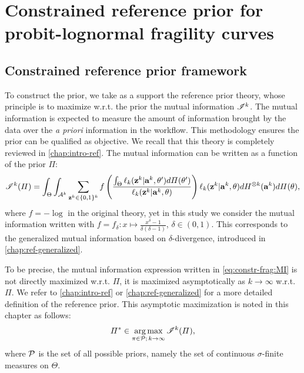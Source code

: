 \section{Constrained reference prior for probit-lognormal fragility curves}\label{sec:constr-frags:constrained}


\subsection{Constrained reference prior framework}\label{sec:constr-frags:subsec-constr-frame}



To construct the prior, we take as a support the reference prior theory, whose principle is to maximize w.r.t. the prior the mutual information $\mathscr{I}^k$. The mutual information is expected to measure the amount of information brought by the data over the \emph{a priori} information in the workflow. This methodology ensures the prior can be qualified as objective. We recall that this theory is completely reviewed in   \cref{chap:intro-ref}.
The mutual information can be written as a function of the prior $\varPi$:
\begin{equation}\label{eq:constr-frag:MI}
    \mathscr{I}^k(\varPi) = \int_{\Theta}\int_{\mathcal{A}^k}\sum_{\mathbf{z}^k\in\{0,1\}^k}f\left(\frac{\int_\Theta\ell_k(\mathbf{z}^k|\mathbf{a}^k,\theta')d\varPi(\theta')  }{\ell_k(\mathbf{z}^k|\mathbf{a}^k,\theta)}\right)\ell_k(\mathbf{z}^k|\mathbf{a}^k,\theta)dH^{\otimes k}(\mathbf{a}^k)d\varPi(\theta)  ,    
\end{equation}
where $f=-\log$ in the original theory, yet in this study we consider the mutual information written with $f=f_\delta:x\mapsto\frac{x^\delta-1}{\delta(\delta-1)}$, $\delta\in(0,1)$.
This corresponds to the generalized mutual information 
based on $\delta$-divergence, introduced in   \cref{chap:ref-generalized}. 

To be precise, the mutual information expression written in \cref{eq:constr-frag:MI} is not directly maximized w.r.t. $\varPi$, it is maximized asymptotically as $k\rightarrow\infty$ w.r.t. $\varPi$. We refer to   \cref{chap:intro-ref} or   \cref{chap:ref-generalized} for a more detailed definition of the reference prior. This asymptotic maximization is noted in this chapter as follows:
\begin{equation}\label{eq:constr-frag:optimnoconstr}
    \varPi^\ast\in\operatorname*{arg\,max}_{\pi\in\mathcal{P};\,k\rightarrow\infty}\mathscr{I}^k(\varPi),
\end{equation}
where $\mathcal{P}$ is the set of all possible priors, namely the set of continuous $\sigma$-finite measures on $\Theta$.

